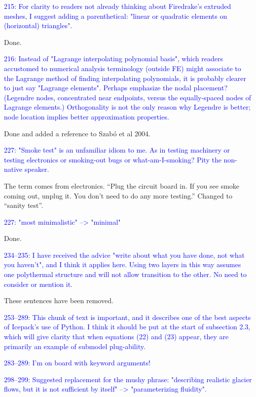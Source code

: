 \documentclass{article}
\theoremstyle{definition}
\theoremstyle{plain}
\begin{document}
\textcolor{blue}{215:  For clarity to readers not already thinking about Firedrake's extruded meshes, I suggest adding a parenthetical: "linear or quadratic elements on (horizontal) triangles".}

Done.

\textcolor{blue}{216:  Instead of "Lagrange interpolating polynomial basis", which readers accustomed to numerical analysis terminology (outside FE) might associate to the Lagrange method of finding interpolating polynomials, it is probably clearer to just say "Lagrange elements".  Perhaps emphasize the nodal placement?  (Legendre nodes, concentrated near endpoints, versus the equally-spaced nodes of Lagrange elements.)  Orthogonality is not the only reason why Legendre is better; node location implies better approximation properties.}

Done and added a reference to Szab\'o et al 2004.

\textcolor{blue}{227:  "Smoke test" is an unfamiliar idiom to me.  As in testing machinery or testing electronics or smoking-out bugs or what-am-I-smoking?  Pity the non-native speaker.}

The term comes from electronics.
``Plug the circuit board in.
If you see smoke coming out, unplug it.
You don't need to do any more testing.''
Changed to ``sanity test''.

\textcolor{blue}{227:  "most minimalistic" --> "minimal"}

Done.

\textcolor{blue}{234--235:  I have received the advice "write about what you have done, not what you haven't", and I think it applies here.  Using two layers in this way assumes one polythermal structure and will not allow transition to the other.  No need to consider or mention it.}

These sentences have been removed.

\textcolor{blue}{253--289:  This chunk of text is important, and it describes one of the best aspects of Icepack's use of Python.  I think it should be put at the start of subsection 2.3, which will give clarity that when equations (22) and (23) appear, they are primarily an example of submodel plug-ability.}

\textcolor{blue}{283--289:  I'm on board with keyword arguments!}

\textcolor{blue}{298--299:  Suggested replacement for the mushy phrase: "describing realistic glacier flows, but it is not sufficient by itself" --> "parameterizing fluidity".}
\end{document}
